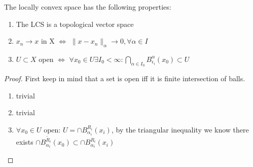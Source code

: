 \begin{theorem}
	The locally convex space has the following properties:
	\begin{enumerate}
		\item The LCS is a topological vector space
		\item $x_n \rightarrow x$ in X $\Leftrightarrow$ $\|x - x_n\|_\alpha \rightarrow 0,  \forall \alpha \in I$
		\item  $U \subset X$ open $\Leftrightarrow$ $\forall x_0 \in U \exists  I_0 < \infty: \bigcap_{\alpha \in  I_0} B_{\epsilon_i}^\alpha(x_0) \subset U$
	\end{enumerate}
\end{theorem}
\begin{proof}
First keep in mind that a set is open iff it is finite intersection of balls.
\begin{enumerate}
	\item trivial
	\item trivial
	\item $\forall x_0 \in U$ open: $U = \cap B_{\alpha_i}^{R_i}(x_i)$, by the triangular inequality we know there exists $\cap B_{\alpha_i}^{\tilde{R}_i}(x_0) \subset \cap B_{\alpha_i}^{R_i}(x_i)$
\end{enumerate}
\end{proof}





